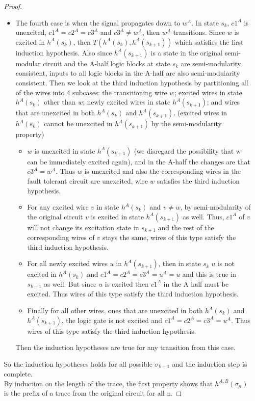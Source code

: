 \documentclass[12pt]{report}
\begin{document}
\begin{proof}
\begin{itemize}
\item The fourth case is when the signal propagates down to $w^A$.  In state $s_k$, $c1^A$ is unexcited, $c1^A=c2^A=c3^A$ and $c3^A\neq w^A$, then $w^A$ transitions.  Since $w$ is excited in $h^A(s_k)$, then $T(h^A(s_k), h^A(s_{k+1}))$ which satisfies the first induction hypothesis.  Also since $h^A(s_{k+1})$ is a state in the original semi-modular circuit and the A-half logic blocks at state $s_k$ are semi-modularity consistent, inputs to all logic blocks in the A-half are also semi-modularity consistent. Then we look at the third induction hypothesis by partitioning all of the wires into 4 subcases: the transitioning wire $w$; excited wires in state $h^A(s_k)$ other than $w$; newly excited wires in state $h^A(s_{k+1})$; and wires that are unexcited in both $h^A(s_k)$ and $h^A(s_{k+1})$.  (excited wires in $h^A(s_k)$ cannot be unexcited in $h^A(s_{k+1})$ by the semi-modularity property)  
\begin{itemize}
\item
$w$ is unexcited in state $h^A(s_{k+1})$ (we disregard the possibility that w can be immediately excited again), and in the A-half the changes are that $c3^{A}= w^{A}$.  Thus $w$ is unexcited and also the corresponding wires in the fault tolerant circuit are unexcited, wire $w$ satisfies the third induction hypothesis.  
\item
For any excited wire $v$ in state $h^A(s_k)$ and $v\neq w$, by semi-modularity of the original circuit $v$ is excited in state $h^A(s_{k+1})$ as well.  Thus, $c1^A$ of $v$ will not change its excitation state in $s_{k+1}$ and the rest of the corresponding wires of $v$ stays the same, wires of this type satisfy the third induction hypothesis.  
\item
For all newly excited wires $u$ in $h^A(s_{k+1})$, then in state $s_{k}$ $u$ is not excited in $h^A(s_k)$ and $c1^A=c2^A=c3^A=u^A=u$ and this is true in $s_{k+1}$ as well.  But since $u$ is excited then $c1^A$ in the A half must be excited.  Thus wires of this type satisfy the third induction hypothesis. 
\item
Finally for all other wires, ones that are unexcited in both $h^A(s_k)$ and $h^A(s_{k+1})$, the logic gate is not excited and $c1^A=c2^A=c3^A=u^A$.  Thus wires of this type satisfy the third induction hypothesis.  
\end{itemize}
Then the induction hypotheses are true for any transition from this case. 
\end{itemize}
So the induction hypotheses holds for all possible $\sigma_{k+1}$ and the induction step is complete. \\
By induction on the length of the trace, the first property shows that $h^{A,B}(\sigma_n)$ is the prefix of a trace from the original circuit for all n.


\end{proof}
\end{document}
